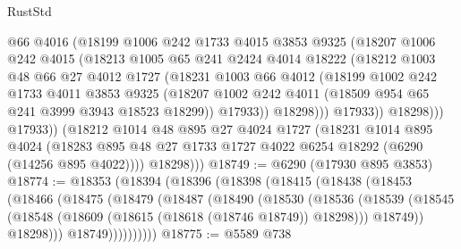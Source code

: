 \begin{lexlean}{RustStd}
\begin{coremodule}
                    @66
                    @4016
                    (@18199
                      @1006
                      @242
                      @1733
                      @4015
                      @3853
                      @9325
                      (@18207
                        @1006
                        @242
                        @4015
                        (@18213
                          @1005
                          @65
                          @241
                          @2424
                          @4014
                          @18222
                          (@18212
                            @1003
                            @48
                            @66
                            @27
                            @4012
                            @1727
                            (@18231
                              @1003
                              @66
                              @4012
                              (@18199
                                @1002
                                @242
                                @1733
                                @4011
                                @3853
                                @9325
                                (@18207
                                  @1002
                                  @242
                                  @4011
                                  (@18509 @954 @65 @241 @3999 @3943 @18523 @18299))
                                @17933))
                            @18298)))
                      @17933))
                  @18298)))
            @17933))
        (@18212
          @1014
          @48
          @895
          @27
          @4024
          @1727
          (@18231
            @1014
            @895
            @4024
            (@18283 @895 @48 @27 @1733 @1727 @4022 @6254 @18292 (@6290 (@14256 @895 @4022))))
          @18298)))
@18749 := @6290 (@17930 @895 @3853)
@18774 := @18353
    (@18394
      (@18396
        (@18398
          (@18415
            (@18438
              (@18453
                (@18466
                  (@18475
                    (@18479
                      (@18487
                        (@18490
                          (@18530
                            (@18536
                              (@18539
                                (@18545
                                  (@18548 (@18609 (@18615 (@18618 (@18746 @18749)) @18298)))
                                  @18749))
                              @18298)))
                        @18749))))))))))
@18775 := @5589 @738

\end{coremodule}
\end{lexlean}
